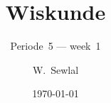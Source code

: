 \documentclass{beamer}
\title{Wiskunde}
\date{\today}
\subtitle{Periode~5 --- week~1}
\author{W.~Sewlal}
\begin{document}
\frame{\titlepage}
% 


\end{document}
